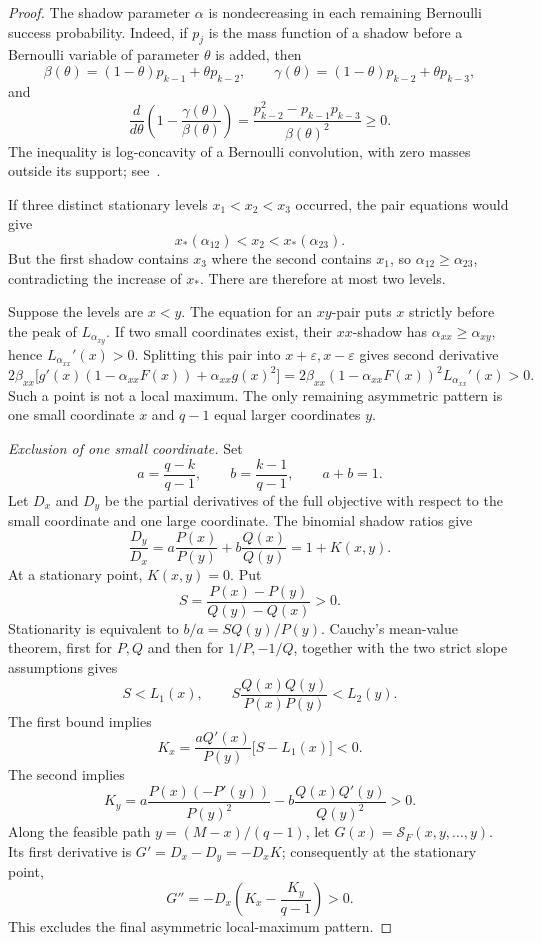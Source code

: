 \documentclass[11pt]{article}
\theoremstyle{definition}
\theoremstyle{remark}
\newcommand{\1}{\mathbf 1}
\begin{document}
\begin{proof}
The shadow parameter \(\alpha\) is nondecreasing in each remaining
Bernoulli success probability.  Indeed, if \(p_j\) is the mass
function of a shadow before a Bernoulli variable of parameter
\(\theta\) is added, then
\[
  \beta(\theta)=(1-\theta)p_{k-1}+\theta p_{k-2},\qquad
  \gamma(\theta)=(1-\theta)p_{k-2}+\theta p_{k-3},
\]
and
\[
  \frac d{d\theta}\left(1-\frac{\gamma(\theta)}{\beta(\theta)}\right)
  =\frac{p_{k-2}^2-p_{k-1}p_{k-3}}{\beta(\theta)^2}\ge0.
\]
The inequality is log-concavity of a Bernoulli convolution, with
zero masses outside its support; see~\cite{Liggett1997}.

If three distinct stationary levels \(x_1<x_2<x_3\) occurred, the
pair equations would give
\[
  x_*(\alpha_{12})<x_2<x_*(\alpha_{23}).
\]
But the first shadow contains \(x_3\) where the second contains
\(x_1\), so \(\alpha_{12}\ge\alpha_{23}\), contradicting the
increase of \(x_*\).  There are therefore at most two levels.

Suppose the levels are \(x<y\).  The equation for an \(xy\)-pair
puts \(x\) strictly before the peak of \(L_{\alpha_{xy}}\).
If two small coordinates exist, their \(xx\)-shadow has
\(\alpha_{xx}\ge\alpha_{xy}\), hence
\(L_{\alpha_{xx}}'(x)>0\).  Splitting this pair into
\(x+\varepsilon,x-\varepsilon\) gives second derivative
\[
  2\beta_{xx}\bigl[g'(x)(1-\alpha_{xx}F(x))
                         +\alpha_{xx}g(x)^2\bigr]
  =2\beta_{xx}(1-\alpha_{xx}F(x))^2L_{\alpha_{xx}}'(x)>0.
\]
Such a point is not a local maximum.  The only remaining asymmetric
pattern is one small coordinate \(x\) and \(q-1\) equal larger
coordinates \(y\).

\medskip\noindent\emph{Exclusion of one small coordinate.}
Set
\[
  a=\frac{q-k}{q-1},\qquad b=\frac{k-1}{q-1},\qquad a+b=1.
\]
Let \(D_x\) and \(D_y\) be the partial derivatives of the full
objective with respect to the small coordinate and one large
coordinate.  The binomial shadow ratios give
\[
  \frac{D_y}{D_x}
  =a\frac{P(x)}{P(y)}+b\frac{Q(x)}{Q(y)}
  =1+K(x,y).
\]
At a stationary point, \(K(x,y)=0\).  Put
\[
  S=\frac{P(x)-P(y)}{Q(y)-Q(x)}>0.
\]
Stationarity is equivalent to \(b/a=S Q(y)/P(y)\).
Cauchy's mean-value theorem, first for \(P,Q\) and then for
\(1/P,-1/Q\), together with the two strict slope assumptions gives
\begin{equation}\label{eq:common-response-secant-bounds}
  S<L_1(x),\qquad
  S\frac{Q(x)Q(y)}{P(x)P(y)}<L_2(y).
\end{equation}
The first bound implies
\[
  K_x=\frac{aQ'(x)}{P(y)}\bigl[S-L_1(x)\bigr]<0.
\]
The second implies
\[
  K_y
  =a\frac{P(x)(-P'(y))}{P(y)^2}
    -b\frac{Q(x)Q'(y)}{Q(y)^2}>0.
\]
Along the feasible path \(y=(M-x)/(q-1)\), let
\(G(x)=\mathcal S_F(x,y,\ldots,y)\).  Its first derivative is
\(G'=D_x-D_y=-D_xK\); consequently at the stationary point,
\[
  G''=-D_x\left(K_x-\frac{K_y}{q-1}\right)>0.
\]
This excludes the final asymmetric local-maximum pattern.


\end{proof}
\end{document}
